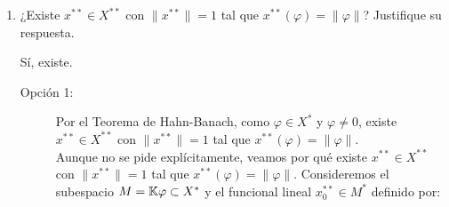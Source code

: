 \documentclass[12pt]{article}
\begin{document}
\begin{ejercicio}
\begin{enumerate}[label=\alph*)]
\begin{itemize}
                De aquí, se deduce que $e^{-i\theta} (2t - 1) f_0(t)$ es un número real no negativo para todo $t \in [0, 1]$, luego:
                \begin{equation*}
                    e^{-i\theta} f_0(t) = \frac{|2t - 1| |f_0(t)|}{2t - 1}
                    \Longrightarrow
                    f_0(t) = e^{i\theta} \frac{|2t - 1|}{2t - 1} \qquad \forall t \in [0, 1] \setminus \{\nicefrac{1}{2}\}.
                \end{equation*}

                Estudiemos la continuidad en $t = \nicefrac{1}{2}$:
                \begin{align*}
                    \lim_{t \to \nicefrac{1}{2}^-} f_0(t) &= \lim_{t \to \nicefrac{1}{2}^-} e^{i\theta} \frac{|2t - 1|}{2t - 1} = \lim_{t \to \nicefrac{1}{2}^-} e^{i\theta} \frac{-(2t - 1)}{2t - 1} = -e^{i\theta},\\
                    \lim_{t \to \nicefrac{1}{2}^+} f_0(t) &= \lim_{t \to \nicefrac{1}{2}^+} e^{i\theta} \frac{|2t - 1|}{2t - 1} = \lim_{t \to \nicefrac{1}{2}^+} e^{i\theta} \frac{2t - 1}{2t - 1} = e^{i\theta}.
                \end{align*}

                Como $f_0$ es continua, se tiene que $e^{i\theta} = -e^{i\theta}$. No existe ningún número complejo con módulo 1 que cumpla esta igualdad, por lo que se llega a una contradicción. Por lo tanto, $\varphi$ no alcanza su norma.                
            \end{itemize}
            \item ¿Existe $x^{**} \in X^{**}$ con $\|x^{**}\| = 1$ tal que $x^{**}(\varphi) = \|\varphi\|$? Justifique su respuesta.
            
            Sí, existe.
            \begin{description}
                \item[Opción 1:] Por el Teorema de Hahn-Banach, como $\varphi \in X^*$ y $\varphi \neq 0$, existe $x^{**} \in X^{**}$ con $\|x^{**}\| = 1$ tal que $x^{**}(\varphi) = \|\varphi\|$.\\
                
                Aunque no se pide explícitamente, veamos por qué existe $x^{**} \in X^{**}$ con $\|x^{**}\| = 1$ tal que $x^{**}(\varphi) = \|\varphi\|$. Consideremos el subespacio $M=\mathbb{K}\varphi \subset X^*$ y el funcional lineal $x_0^{**} \in M^*$ definido por:
                

\end{description}
\end{enumerate}
\end{ejercicio}
\end{document}
